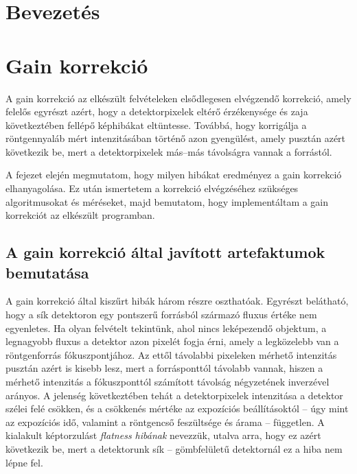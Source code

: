 \documentclass[a4paper,12pt]{article}
\begin{document}
\hspace{9cm}




\clearpage


 \tableofcontents

\clearpage

	






\section{Bevezetés}

\section{Gain korrekció}


A gain korrekció az elkészült felvételeken elsődlegesen elvégzendő korrekció, amely felelős egyrészt azért, hogy a detektorpixelek eltérő érzékenysége és zaja következtében fellépő képhibákat eltüntesse. Továbbá, hogy korrigálja a röntgennyaláb mért intenzitásában történő azon gyengülést, amely pusztán azért következik be, mert a detektorpixelek más--más távolságra vannak a forrástól.

A fejezet elején megmutatom, hogy milyen hibákat eredményez a gain korrekció elhanyagolása. Ez után ismertetem a korrekció elvégzéséhez szükséges algoritmusokat és méréseket, majd bemutatom, hogy implementáltam a gain korrekciót az elkészült programban. 

\subsection{A gain korrekció által javított artefaktumok bemutatása}

A gain korrekció által kiszűrt hibák három részre oszthatóak. Egyrészt belátható, hogy a sík detektoron egy pontszerű forrásból származó fluxus értéke nem egyenletes. Ha olyan felvételt tekintünk, ahol nincs leképezendő objektum, a legnagyobb fluxus a detektor azon pixelét fogja érni, amely a legközelebb van a röntgenforrás fókuszpontjához. Az ettől távolabbi pixeleken mérhető intenzitás pusztán azért is kisebb lesz, mert a forrásponttól távolabb vannak, hiszen a mérhető intenzitás a fókuszponttól számított távolság négyzetének inverzével arányos. A jelenség következtében tehát a detektorpixelek intenzitása a detektor szélei felé csökken, és a csökkenés mértéke az expozíciós beállításoktól -- úgy mint az expozíciós idő, valamint a röntgencső feszültsége és árama -- független. A kialakult képtorzulást \emph{flatness hibának} nevezzük, utalva arra, hogy ez azért következik be, mert a detektorunk sík -- gömbfelületű detektornál ez a hiba nem lépne fel.
\end{document}
